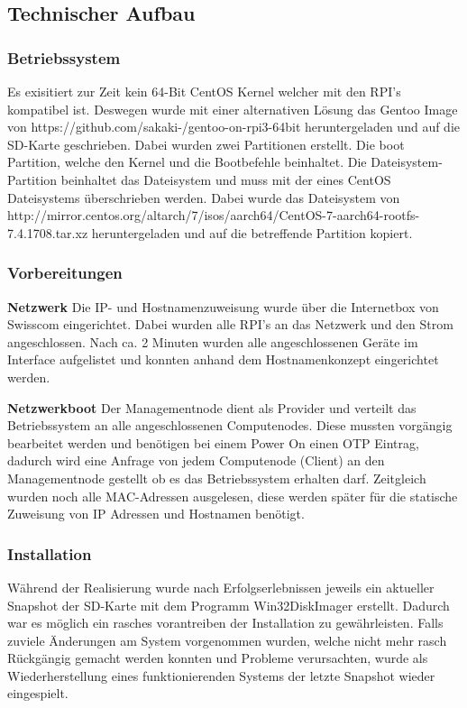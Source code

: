 \subsection{Technischer Aufbau}
\subsubsection{Betriebssystem}
Es exisitiert zur Zeit kein 64-Bit CentOS Kernel welcher mit den RPI's kompatibel ist. Deswegen wurde mit einer alternativen Lösung das Gentoo Image von https://github.com/sakaki-/gentoo-on-rpi3-64bit heruntergeladen und auf die SD-Karte geschrieben. Dabei wurden zwei Partitionen erstellt. Die boot Partition, welche den Kernel und die Bootbefehle beinhaltet. Die Dateisystem-Partition beinhaltet das Dateisystem und muss mit der eines CentOS Dateisystems überschrieben werden. Dabei wurde das Dateisystem von http://mirror.centos.org/altarch/7/isos/aarch64/CentOS-7-aarch64-rootfs-7.4.1708.tar.xz heruntergeladen und auf die betreffende Partition kopiert.

\subsubsection{Vorbereitungen}
\textbf{Netzwerk}\newline
Die IP- und Hostnamenzuweisung wurde über die Internetbox von Swisscom eingerichtet. Dabei wurden alle RPI's an das Netzwerk und den Strom angeschlossen. Nach ca. 2 Minuten wurden alle angeschlossenen Geräte im Interface aufgelistet und konnten anhand dem Hostnamenkonzept eingerichtet werden.

\textbf{Netzwerkboot}\newline
Der Managementnode dient als Provider und verteilt das Betriebssystem an alle angeschlossenen Computenodes. Diese mussten vorgängig bearbeitet werden und benötigen bei einem Power On einen OTP Eintrag, dadurch wird eine Anfrage von jedem Computenode (Client) an den Managementnode gestellt ob es das Betriebssystem erhalten darf. Zeitgleich wurden noch alle MAC-Adressen ausgelesen, diese werden später für die statische Zuweisung von IP Adressen und Hostnamen benötigt.

\subsubsection{Installation}

Während der Realisierung wurde nach Erfolgserlebnissen jeweils ein aktueller Snapshot der SD-Karte mit dem Programm Win32DiskImager erstellt. Dadurch war es möglich ein rasches vorantreiben der Installation zu gewährleisten. Falls zuviele Änderungen am System vorgenommen wurden, welche nicht mehr rasch Rückgängig gemacht werden konnten und Probleme verursachten, wurde als Wiederherstellung eines funktionierenden Systems der letzte Snapshot wieder eingespielt.

